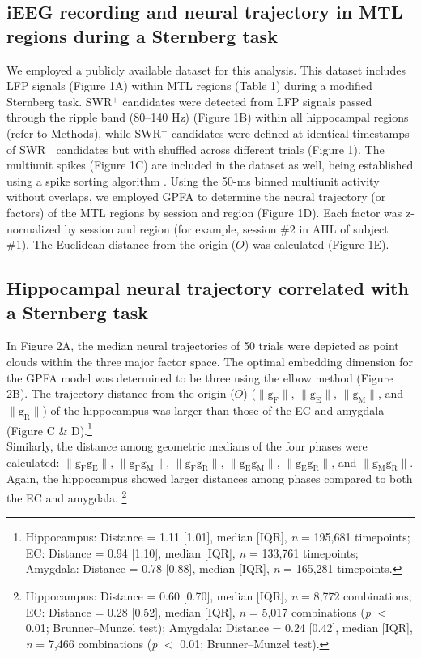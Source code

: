 \documentclass[final,3p,times,twocolumn]{elsarticle}
\begin{document}
\subsection{iEEG recording and neural trajectory in MTL regions during a Sternberg task}
We employed a publicly available dataset \cite{boran_dataset_2020} for this analysis. This dataset includes LFP signals (Figure 1A) within MTL regions (Table 1) during a modified Sternberg task. SWR$^+$ candidates were detected from LFP signals passed through the ripple band (80--140 Hz) (Figure 1B) within all hippocampal regions (refer to Methods), while SWR$^-$ candidates were defined at identical timestamps of SWR$^+$ candidates but with shuffled across different trials (Figure 1). The multiunit spikes (Figure 1C) are included in the dataset as well, being established using a spike sorting algorithm \cite{niediek_reliable_2016}. Using the 50-ms binned multiunit activity without overlaps, we employed GPFA \cite{yu_gaussian-process_2009} to determine the neural trajectory (or factors) of the MTL regions by session and region (Figure 1D). Each factor was z-normalized by session and region (for example, session \#2 in AHL of subject \#1). The Euclidean distance from the origin ($O$) was calculated (Figure 1E).

\subsection{Hippocampal neural trajectory correlated with a Sternberg task}
In Figure 2A, the median neural trajectories of 50 trials were depicted as point clouds within the three major factor space. The optimal embedding dimension for the GPFA model was determined to be three using the elbow method (Figure 2B). The trajectory distance from the origin ($O$) ($\mathrm{\lVert g_{F} \rVert}$, $\mathrm{\lVert g_{E} \rVert}$, $\mathrm{\lVert g_{M} \rVert}$, and $\mathrm{\lVert g_{R} \rVert}$) of the hippocampus was larger than those of the EC and amygdala (Figure C \& D).\footnote{Hippocampus: Distance = 1.11 [1.01], median [IQR], \textit{n} = 195,681 timepoints; EC: Distance = 0.94 [1.10], median [IQR], \textit{n} = 133,761 timepoints; Amygdala: Distance = 0.78 [0.88], median [IQR], \textit{n} = 165,281 timepoints.}
\\
\indent
Similarly, the distance among geometric medians of the four phases were calculated: $\mathrm{\lVert g_{F}g_{E} \rVert}$, $\mathrm{\lVert g_{F}g_{M} \rVert}$, $\mathrm{\lVert g_{F}g_{R} \rVert}$, $\mathrm{\lVert g_{E}g_{M} \rVert}$, $\mathrm{\lVert g_{E}g_{R} \rVert}$, and $\mathrm{\lVert g_{M}g_{R} \rVert}$. Again, the hippocampus showed larger distances among phases compared to both the EC and amygdala. \footnote{Hippocampus: Distance = 0.60 [0.70], median [IQR], \textit{n} = 8,772 combinations; EC: Distance = 0.28 [0.52], median [IQR], \textit{n} = 5,017 combinations (\textit{p} $<$ 0.01; Brunner--Munzel test); Amygdala: Distance = 0.24 [0.42], median [IQR], \textit{n} = 7,466 combinations (\textit{p} $<$ 0.01; Brunner--Munzel test).}
\end{document}
